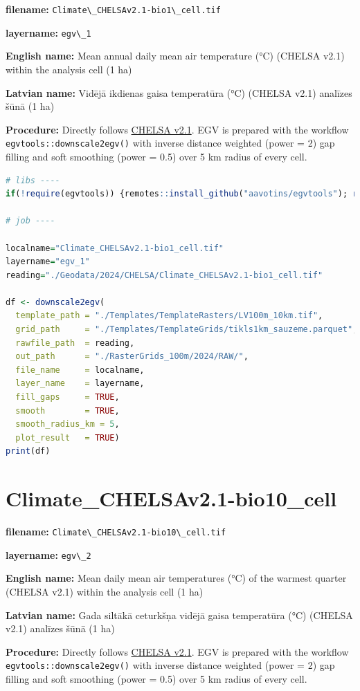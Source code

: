 \documentclass[
]{book}
\newcommand{\passthrough}[1]{#1}
\begin{document}
\textbf{filename:} \passthrough{\lstinline!Climate\_CHELSAv2.1-bio1\_cell.tif!}

\textbf{layername:} \passthrough{\lstinline!egv\_1!}

\textbf{English name:} Mean annual daily mean air temperature (°C) (CHELSA v2.1) within the analysis cell (1 ha)

\textbf{Latvian name:} Vidējā ikdienas gaisa temperatūra (°C) (CHELSA v2.1) analīzes šūnā (1 ha)

\textbf{Procedure:} Directly follows \hyperref[Ch04.11]{CHELSA v2.1}. EGV is prepared with the
workflow \passthrough{\lstinline!egvtools::downscale2egv()!} with inverse distance weighted (power = 2)
gap filling and soft smoothing (power = 0.5) over 5 km radius of every cell.

\begin{lstlisting}[language=R]
# libs ----
if(!require(egvtools)) {remotes::install_github("aavotins/egvtools"); require(egvtools)}

# job ----

localname="Climate_CHELSAv2.1-bio1_cell.tif"
layername="egv_1"
reading="./Geodata/2024/CHELSA/Climate_CHELSAv2.1-bio1_cell.tif"

df <- downscale2egv(
  template_path = "./Templates/TemplateRasters/LV100m_10km.tif",
  grid_path     = "./Templates/TemplateGrids/tikls1km_sauzeme.parquet",
  rawfile_path  = reading,
  out_path      = "./RasterGrids_100m/2024/RAW/",
  file_name     = localname,
  layer_name    = layername,
  fill_gaps     = TRUE,
  smooth        = TRUE,
  smooth_radius_km = 5,
  plot_result   = TRUE)
print(df)
\end{lstlisting}

\section{Climate\_CHELSAv2.1-bio10\_cell}\label{ch06.002}

\textbf{filename:} \passthrough{\lstinline!Climate\_CHELSAv2.1-bio10\_cell.tif!}

\textbf{layername:} \passthrough{\lstinline!egv\_2!}

\textbf{English name:} Mean daily mean air temperatures (°C) of the warmest quarter (CHELSA v2.1) within the analysis cell (1 ha)

\textbf{Latvian name:} Gada siltākā ceturkšņa vidējā gaisa temperatūra (°C) (CHELSA v2.1) analīzes šūnā (1 ha)

\textbf{Procedure:} Directly follows \hyperref[Ch04.11]{CHELSA v2.1}. EGV is prepared with the
workflow \passthrough{\lstinline!egvtools::downscale2egv()!} with inverse distance weighted (power = 2)
gap filling and soft smoothing (power = 0.5) over 5 km radius of every cell.
\end{document}
